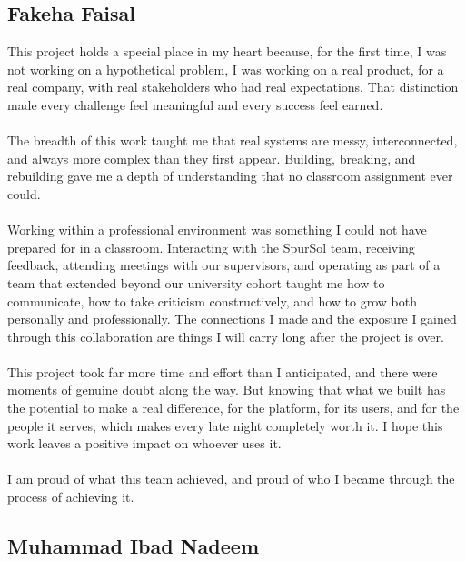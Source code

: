 \subsection{Fakeha Faisal}
This project holds a special place in my heart because, for the first time, I was not working on a hypothetical problem, I was working on a real product, for a real company, with real stakeholders who had real expectations. That distinction made every challenge feel meaningful and every success feel earned.
\\\\
The breadth of this work taught me that real systems are messy, interconnected, and always more complex than they first appear. Building, breaking, and rebuilding gave me a depth of understanding that no classroom assignment ever could.
\\\\
Working within a professional environment was something I could not have prepared for in a classroom. Interacting with the SpurSol team, receiving feedback, attending meetings with our supervisors, and operating as part of a team that extended beyond our university cohort taught me how to communicate, how to take criticism constructively, and how to grow both personally and professionally. The connections I made and the exposure I gained through this collaboration are things I will carry long after the project is over.
\\\\
This project took far more time and effort than I anticipated, and there were moments of genuine doubt along the way. But knowing that what we built has the potential to make a real difference, for the platform, for its users, and for the people it serves, which makes every late night completely worth it. I hope this work leaves a positive impact on whoever uses it.
\\\\
I am proud of what this team achieved, and proud of who I became through the process of achieving it.

\subsection{Muhammad Ibad Nadeem}

